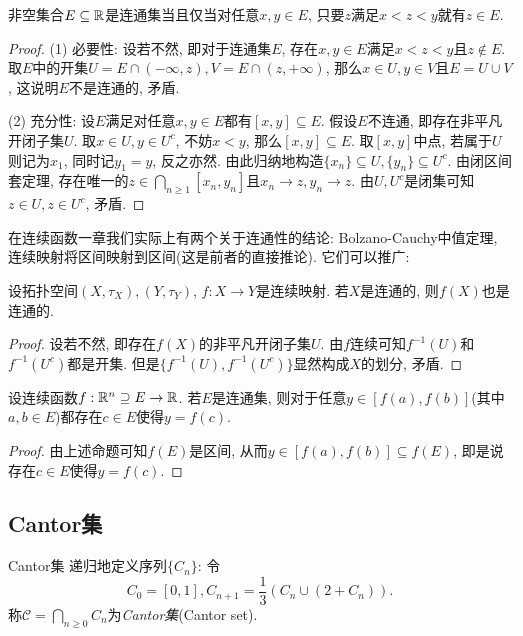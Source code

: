 \begin{proposition}{}
	非空集合$E \subseteq \mathbb{R}$是连通集当且仅当对任意$x,y \in E$, 只要$z$满足$x<z<y$就有$z \in E$. 
\end{proposition}
\begin{proof}
	(1) 必要性: 设若不然, 即对于连通集$E$, 存在$x,y \in E$满足$x<z<y$且$z \notin E$. 取$E$中的开集$U=E \cap (-\infty ,z), V=E \cap (z,+\infty)$, 那么$x \in U,y \in V$且$E=U \cup V$, 这说明$E$不是连通的, 矛盾. 
	
	(2) 充分性: 设$E$满足对任意$x,y \in E$都有$[x,y] \subseteq E$. 假设$E$不连通, 即存在非平凡开闭子集$U$. 取$x \in U, y \in U^c$, 不妨$x<y$, 那么$[x,y] \subseteq E$. 取$[x,y]$中点, 若属于$U$则记为$x_1$, 同时记$y_1=y$, 反之亦然. 由此归纳地构造$\{ x_n \} \subseteq U, \{ y_n \} \subseteq U^c$. 由闭区间套定理, 存在唯一的$z \in  \bigcap_{n\geq 1} [x_n,y_n]$且$x_n \to z,y_n \to z$. 由$U,U^c$是闭集可知$z \in U, z \in U^c$, 矛盾. 
\end{proof}

在连续函数一章我们实际上有两个关于连通性的结论: Bolzano-Cauchy中值定理, 连续映射将区间映射到区间(这是前者的直接推论). 它们可以推广: 

\begin{theorem}{}
	设拓扑空间$(X,\tau _X),(Y,\tau _Y)$, $f:X\to Y$是连续映射. 若$X$是连通的, 则$f(X)$也是连通的. 
\end{theorem}
\begin{proof}
	设若不然, 即存在$f(X)$的非平凡开闭子集$U$. 由$f$连续可知$f^{-1}(U)$和$f^{-1}(U^c)$都是开集. 但是$\{ f^{-1}(U), f^{-1}(U^c) \}$显然构成$X$的划分, 矛盾. 
\end{proof}

\begin{theorem}{}
	设连续函数$f:\mathbb{R} ^n \supseteq E \to \mathbb{R}$. 若$E$是连通集, 则对于任意$y \in [f(a),f(b)]$(其中$a,b \in E$)都存在$c \in E$使得$y=f(c)$. 
\end{theorem}
\begin{proof}
	由上述命题可知$f(E)$是区间, 从而$y \in [f(a),f(b)] \subseteq f(E)$, 即是说存在$c \in E$使得$y=f(c)$. 
\end{proof}

\subsection{Cantor集}

\begin{definition}{Cantor集}
	递归地定义序列$\{ C_n \}$: 令$$C_0 = [0,1], C_{n+1} = \frac{1}{3}(C_n \cup (2+C_n)).$$
	称$\mathcal{C} = \bigcap_{n \geq 0} C_n$为\textit{Cantor集}(Cantor set). 
\end{definition}


